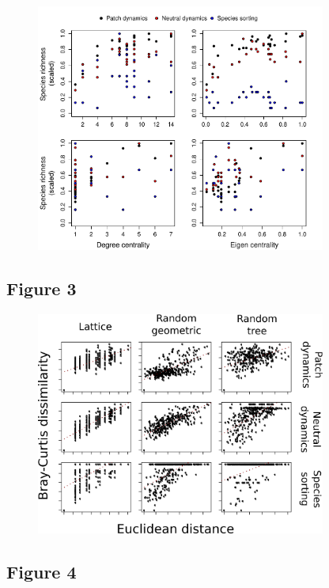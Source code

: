 \documentclass[12pt]{article}
\begin{document}
\begin{figure}[ht!]
	\centering\includegraphics[width=0.85\textwidth]{Centrality.pdf}
\end{figure}

\newpage

\subsection*{Figure 3}

\begin{figure}[ht!]
	\centering\includegraphics[width=0.85\textwidth]{BetaGeoDist.png}
\end{figure}

\newpage

\subsection*{Figure 4}
\end{document}
